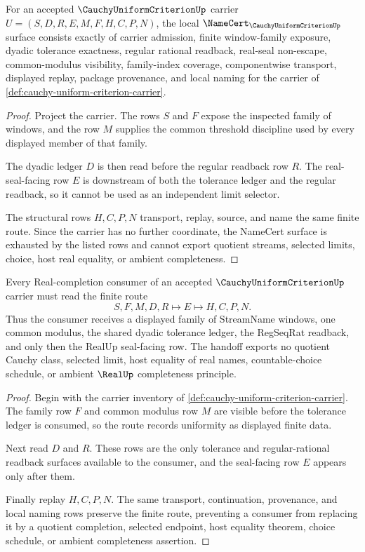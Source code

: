 \begin{theorem}
\label{thm:cauchy-uniform-criterion-namecert-obligations}
For an accepted $\CauchyUniformCriterionUp$ carrier $U=(S,D,R,E,M,F,H,C,P,N)$, the local $\NameCert_{\CauchyUniformCriterionUp}$ surface consists exactly of carrier admission, finite window-family exposure, dyadic tolerance exactness, regular rational readback, real-seal non-escape, common-modulus visibility, family-index coverage, componentwise transport, displayed replay, package provenance, and local naming for the carrier of \autoref{def:cauchy-uniform-criterion-carrier}.
\end{theorem}
\begin{proof}
Project the carrier. The rows $S$ and $F$ expose the inspected family of windows, and the row $M$ supplies the common threshold discipline used by every displayed member of that family.

The dyadic ledger $D$ is then read before the regular readback row $R$. The real-seal-facing row $E$ is downstream of both the tolerance ledger and the regular readback, so it cannot be used as an independent limit selector.

The structural rows $H,C,P,N$ transport, replay, source, and name the same finite route. Since the carrier has no further coordinate, the NameCert surface is exhausted by the listed rows and cannot export quotient streams, selected limits, choice, host real equality, or ambient completeness.
\end{proof}

\begin{theorem}
\label{thm:cauchy-uniform-criterion-real-completion-handoff}
Every Real-completion consumer of an accepted $\CauchyUniformCriterionUp$ carrier must read the finite route
$$
S,F,M,D,R \longmapsto E \longmapsto H,C,P,N .
$$
Thus the consumer receives a displayed family of StreamName windows, one common modulus, the shared dyadic tolerance ledger, the RegSeqRat readback, and only then the RealUp seal-facing row. The handoff exports no quotient Cauchy class, selected limit, host equality of real names, countable-choice schedule, or ambient $\RealUp$ completeness principle.
\end{theorem}
\begin{proof}
Begin with the carrier inventory of \autoref{def:cauchy-uniform-criterion-carrier}. The family row $F$ and common modulus row $M$ are visible before the tolerance ledger is consumed, so the route records uniformity as displayed finite data.

Next read $D$ and $R$. These rows are the only tolerance and regular-rational readback surfaces available to the consumer, and the seal-facing row $E$ appears only after them.

Finally replay $H,C,P,N$. The same transport, continuation, provenance, and local naming rows preserve the finite route, preventing a consumer from replacing it by a quotient completion, selected endpoint, host equality theorem, choice schedule, or ambient completeness assertion.
\end{proof}

